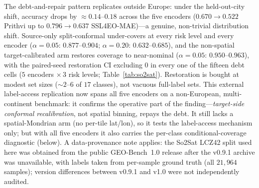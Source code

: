 \documentclass[journal]{IEEEtran}
\renewcommand{\_}{\textunderscore\allowbreak}
\begin{document}
The debt-and-repair pattern replicates outside Europe: under the held-out-city shift, accuracy
drops by ${\approx}0.14$--$0.18$ across the five encoders ($0.670\to0.522$ Prithvi up to $0.796\to0.637$
SSL4EO-MAE)---a genuine, non-trivial distribution shift.
Source-only split-conformal under-covers at every risk level and every encoder ($\alpha=0.05$: $0.877$--$0.904$;
$\alpha=0.20$: $0.632$--$0.685$), and the non-spatial target-calibrated arm restores coverage to
near-nominal ($\alpha=0.05$: $0.950$--$0.963$), with the paired-seed restoration CI
excluding $0$ in every one of the fifteen debt cells ($5$ encoders ${\times}\,3$ risk levels; Table~\ref{tab:so2sat}). Restoration is bought at modest set sizes
(${\sim}2$--$6$ of $17$ classes), not vacuous full-label sets. This external label-access
replication now spans all five encoders on a non-European, multi-continent benchmark: it confirms the operative part of the
finding---\emph{target-side conformal recalibration}, not spatial binning, repays the debt. It still lacks a
spatial-Mondrian arm (no per-tile lat/lon), so it tests the label-access mechanism only; but with all
five encoders it also carries the per-class conditional-coverage diagnostic (below). A data-provenance note applies: the So2Sat LCZ42 split used here
was obtained from the public GEO-Bench~1.0 release after the v0.9.1 archive was unavailable,
with labels taken from per-sample ground truth (all $21{,}964$ samples);
version differences between v0.9.1 and v1.0 were not independently audited.
\end{document}
